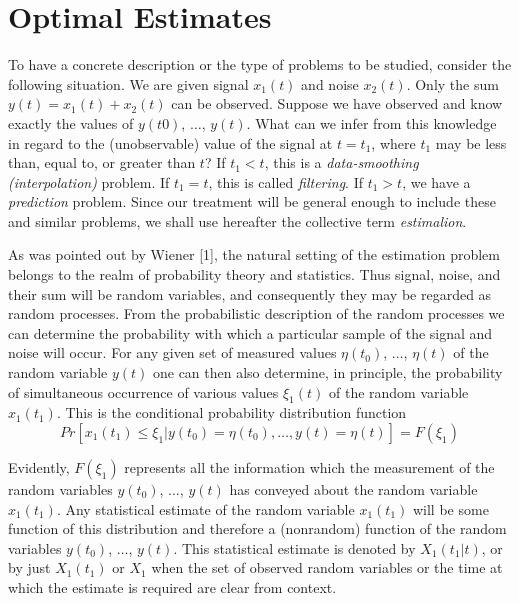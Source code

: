 \documentclass{article}
\begin{document}
\section{Optimal Estimates}
To have a concrete description or the type of problems to be studied, consider the following situation. We are given signal $x_1(t)$ and noise $x_2(t)$. Only the sum $y(t) = x_1(t) + x_2(t)$ can be observed. Suppose we have observed and know exactly the values of $y(t0)$, $\dotsc$, $y(t)$. What can we infer from this knowledge in regard to the (unobservable) value of the signal at $t = t_1$, where $t_1$ may be less than, equal to, or greater than $t$? If $t_1 < t$, this is a \emph{data-smoothing (interpolation)} problem. If $t_1 = t$, this is called \emph{filtering}. If $t_1 > t$, we have a \emph{prediction} problem. Since our treatment will be general enough to include these and similar problems, we shall use hereafter the collective term \emph{estimalion}.

As was pointed out by Wiener [1], the natural setting of the estimation problem belongs to the realm of probability theory and statistics. Thus signal, noise, and their sum will be random variables, and consequently they may be regarded as random processes. From the probabilistic description of the random processes we can determine the probability with which a particular sample of the signal and noise will occur. For any given set of measured values $\eta(t_0)$, $\dotsc$, $\eta(t)$ of the random variable $y(t)$ one can then also determine, in principle, the probability of simultaneous occurrence of various values $\xi_1(t)$ of the random variable $x_1(t_1)$. This is the conditional probability distribution function
\begin{equation}
\label{eq1}
Pr[x_1(t_1) \le \xi_1 \vert y(t_0)=\eta(t_0), \dotsc, y(t)=\eta(t)]=F(\xi_1)
\end{equation}

Evidently, $F(\xi_1)$ represents all the information which the measurement of the random variables $y(t_0)$, $\dotsc$, $y(t)$ has conveyed about the random variable $x_1(t_1)$. Any statistical estimate of the random variable $x_1(t_1)$ will be some function of this distribution and therefore a (nonrandom) function of the random variables $y(t_0)$, $\dotsc$, $y(t)$. This statistical estimate is denoted by $X_1(t_1 \vert t)$, or by just $X_1(t_1)$ or $X_1$ when the set of observed random variables or the time at which the estimate is required are clear from context.
\end{document}
